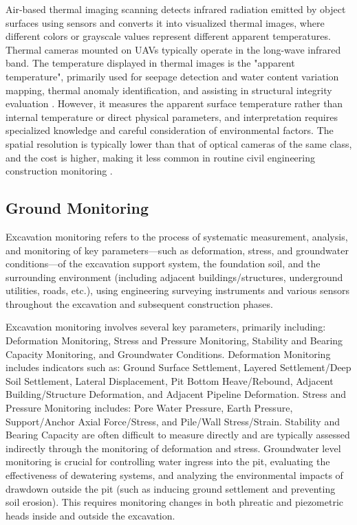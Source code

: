 \documentclass[preprint,11pt,authoryear,3p]{elsarticle}
\begin{document}
Air-based thermal imaging scanning detects infrared radiation emitted by object surfaces using sensors and converts it into visualized thermal images, where different colors or grayscale values represent different apparent temperatures. Thermal cameras mounted on UAVs typically operate in the long-wave infrared band. The temperature displayed in thermal images is the "apparent temperature", primarily used for seepage detection and water content variation mapping, thermal anomaly identification, and assisting in structural integrity evaluation \citep{wang2023removing,meng2022robust}. However, it measures the apparent surface temperature rather than internal temperature or direct physical parameters, and interpretation requires specialized knowledge and careful consideration of environmental factors. The spatial resolution is typically lower than that of optical cameras of the same class, and the cost is higher, making it less common in routine civil engineering construction monitoring \citep{zhang2024situ}.

\subsection{Ground Monitoring}
Excavation monitoring refers to the process of systematic measurement, analysis, and monitoring of key parameters—such as deformation, stress, and groundwater conditions—of the excavation support system, the foundation soil, and the surrounding environment (including adjacent buildings/structures, underground utilities, roads, etc.), using engineering surveying instruments and various sensors throughout the excavation and subsequent construction phases.

Excavation monitoring involves several key parameters, primarily including: Deformation Monitoring, Stress and Pressure Monitoring, Stability and Bearing Capacity Monitoring, and Groundwater Conditions.\citep{REN202330} Deformation Monitoring includes indicators such as: Ground Surface Settlement, Layered Settlement/Deep Soil Settlement, Lateral Displacement, Pit Bottom Heave/Rebound, Adjacent Building/Structure Deformation, and Adjacent Pipeline Deformation. Stress and Pressure Monitoring includes: Pore Water Pressure, Earth Pressure, Support/Anchor Axial Force/Stress, and Pile/Wall Stress/Strain. Stability and Bearing Capacity are often difficult to measure directly and are typically assessed indirectly through the monitoring of deformation and stress. Groundwater level monitoring is crucial for controlling water ingress into the pit, evaluating the effectiveness of dewatering systems, and analyzing the environmental impacts of drawdown outside the pit (such as inducing ground settlement and preventing soil erosion). This requires monitoring changes in both phreatic and piezometric heads inside and outside the excavation.
\end{document}
